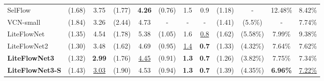 \documentclass[runningheads]{llncs}
\begin{document}
\begin{table*}[t]
{\begin{tabular}{|l|c c|c c|c c c|c c c c|}
\multirow{1}{*}{SelFlow~\cite{Liu19}}				
&(1.68)&\multicolumn{1}{c|}{3.75}           
&(1.77)&\multicolumn{1}{c|}{\textbf{4.26}}
&(0.76)&\multicolumn{1}{c}{1.5}&\multicolumn{1}{c|}{0.9}		
&(1.18)&\multicolumn{1}{c}{-}&\multicolumn{1}{c}{12.48\%}&\multicolumn{1}{c|}{{8.42\%}}\\

\multirow{1}{*}{VCN-small~\cite{Yang19}}				
&(1.84)&\multicolumn{1}{c|}{3.26}           
&(2.44)&\multicolumn{1}{c|}{4.73}
&-&\multicolumn{1}{c}{-}&\multicolumn{1}{c|}{-}		
&(1.41)&\multicolumn{1}{c}{(5.5\%)}&\multicolumn{1}{c}{-}&\multicolumn{1}{c|}{{7.74\%}}\\

\multirow{1}{*}{LiteFlowNet~\cite{Hui18}}				
&(1.35)&\multicolumn{1}{c|}{4.54}           
&(1.78)&\multicolumn{1}{c|}{5.38}
&(1.05)&\multicolumn{1}{c}{1.6}&\multicolumn{1}{c|}{\underline{0.8}}	
&(1.62)&\multicolumn{1}{c}{(5.58\%)}&\multicolumn{1}{c}{7.99\%}&\multicolumn{1}{c|}{9.38\%}\\    

\multirow{1}{*}{LiteFlowNet2~\cite{Hui20}}				
&(1.30)&\multicolumn{1}{c|}{3.48} 
&(1.62)&\multicolumn{1}{c|}{4.69}
&(0.95)&\multicolumn{1}{c}{\underline{1.4}}&\multicolumn{1}{c|}{\textbf{0.7}}		
&(1.33)&\multicolumn{1}{c}{(4.32\%)}&\multicolumn{1}{c}{7.64\%}&\multicolumn{1}{c|}{7.62\%}\\ 

\multirow{1}{*}{\textbf{LiteFlowNet3}}				
&(1.32)&\multicolumn{1}{c|}{\textbf{2.99}}           
&(1.76)&\multicolumn{1}{c|}{\underline{4.45}}
&(0.91)&\multicolumn{1}{c}{\textbf{1.3}}&\multicolumn{1}{c|}{\textbf{0.7}}		
&\multicolumn{1}{c}{(1.26)}&\multicolumn{1}{c}{(3.82\%)}&\multicolumn{1}{c}{7.75\%}&\multicolumn{1}{c|}{7.34\%}\\ 

\multirow{1}{*}{\textbf{LiteFlowNet3-S}}				
&(1.43)&\multicolumn{1}{c|}{\underline{3.03}}           
&(1.90)&\multicolumn{1}{c|}{4.53}
&\multicolumn{1}{c}{(0.94)}&\multicolumn{1}{c}{\textbf{1.3}}&\multicolumn{1}{c|}{\textbf{0.7}}	
&\multicolumn{1}{c}{(1.39)}&\multicolumn{1}{c}{(4.35\%)}&\multicolumn{1}{c}{\textbf{6.96\%}}&\multicolumn{1}{c|}{\underline{7.22\%}}\\ 
\hline
\end{tabular}}
\end{table*}
\end{document}
